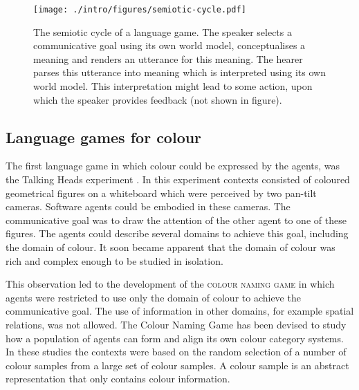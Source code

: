\begin{figure}
  \begin{center}
   \texttt{[image: ./intro/figures/semiotic-cycle.pdf]}
   \caption[The semiotic cycle of a language game]{The semiotic cycle
     of a language game. The speaker selects a communicative goal
     using its own world model, conceptualises a meaning and renders
     an utterance for this meaning. The hearer parses this utterance
     into meaning which is interpreted using its own world model. This
     interpretation might lead to some action, upon which the speaker
     provides feedback (not shown in figure).}
    \label{f:intro-semiotic-cycle}
  \end{center}
\end{figure}

\subsection{Language games for colour}
\label{s:language-games-for-colour}

The first language game in which colour could be expressed by the
agents, was the Talking Heads experiment
\citep{steels99talking}. In this experiment contexts consisted
of coloured geometrical figures on a whiteboard which were perceived
by two pan-tilt cameras. Software agents could be embodied in these
cameras. The communicative goal was to draw the attention of the other
agent to one of these figures. The agents could describe several
domains to achieve this goal, including the domain of colour. It soon
became apparent that the domain of colour was rich and complex enough
to be studied in isolation.

This observation led to the development of the \textsc{colour naming
  game} \citep{steels05coordinating,
  belpaeme05explaining, belpaeme07language, puglisi08cultural,
  baronchelli10modeling} in which agents were restricted to use only
the domain of colour to achieve the communicative goal. The use of
information in other domains, for example spatial relations, was not
allowed. The Colour Naming Game has been devised to study how a
population of agents can form and align its own colour category
systems. In these studies the contexts were based on the random
selection of a number of colour samples from a large set of
colour samples. A colour sample is an abstract representation that
only contains colour information.

